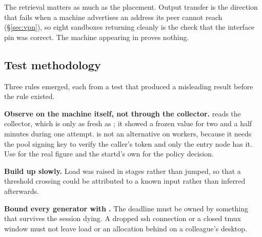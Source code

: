 The retrieval matters as much as the placement. Output transfer is the direction
that fails when a machine advertises an address its peer cannot reach
(\S\ref{sec:vpn}), so eight sandboxes returning cleanly is the check that the
interface pin was correct. The machine appearing in  proves
nothing.

\subsection{Test methodology}

Three rules emerged, each from a test that produced a misleading result before
the rule existed.

\textbf{Observe on the machine itself, not through the collector.}
 reads the collector, which is only as fresh as
; it showed a frozen value for two and a half minutes during
one attempt.  is not an alternative on workers,
because it needs the pool signing key to verify the caller's token and only the
entry node has it. Use  for the real figure and the startd's
own  for the policy decision.

\textbf{Build up slowly.} Load was raised in stages rather than jumped, so that a
threshold crossing could be attributed to a known input rather than inferred
afterwards.

\textbf{Bound every generator with .} The deadline must be owned by
something that survives the session dying. A dropped ssh connection or a closed
tmux window must not leave load or an allocation behind on a colleague's
desktop.
